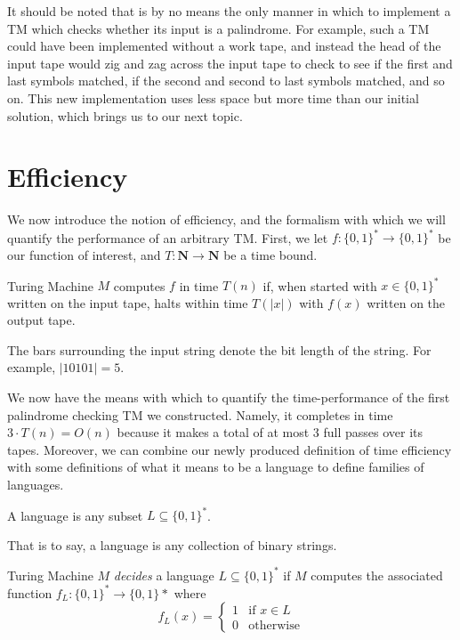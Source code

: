 \documentclass[usletter]{article}
\begin{document}
It should be noted that is by no means the only manner in which to implement a TM which checks whether its input is a palindrome. For example, such a TM could have been implemented without a work tape, and instead the head of the input tape would zig and zag across the input tape to check to see if the first and last symbols matched, if the second and second to last symbols matched, and so on. This new implementation uses less space but more time than our initial solution, which brings us to our next topic.

\section{Efficiency}

We now introduce the notion of efficiency, and the formalism with which we will quantify the performance of an arbitrary TM. First, we let $f : \{0,1\}^* \rightarrow \{0,1\}^*$ be our function of interest, and $T : \mathbf{N} \rightarrow \mathbf{N}$ be a time bound.

\begin{definition}
Turing Machine $M$ computes $f$ in time $T(n)$ if, when started with $x \in \{0,1\}^*$ written on the input tape, halts within time $T(|x|)$ with $f(x)$ written on the output tape.
\end{definition}

The bars surrounding the input string denote the bit length of the string. For example, $|10101| = 5$.

We now have the means with which to quantify the time-performance of the first palindrome checking TM we constructed. Namely, it completes in time $3\cdot T(n) = O(n)$ because it makes a total of at most 3 full passes over its tapes. Moreover, we can combine our newly produced definition of time efficiency with some definitions of what it means to be a language to define families of languages.

\begin{definition}
A language is any subset $L \subseteq \{0,1\}^*$.
\end{definition}

That is to say, a language is any collection of binary strings.

\begin{definition}
Turing Machine $M$ \emph{decides} a language $L \subseteq \{0,1\}^*$ if $M$ computes the associated function $f_L : \{0,1\}^* \rightarrow \{0,1\}*$ where
\[f_L(x)= \begin{cases} 
      1 & \text{if } x \in L \\
      0 & \text{otherwise}
   \end{cases}
\]
\end{definition}
\end{document}
